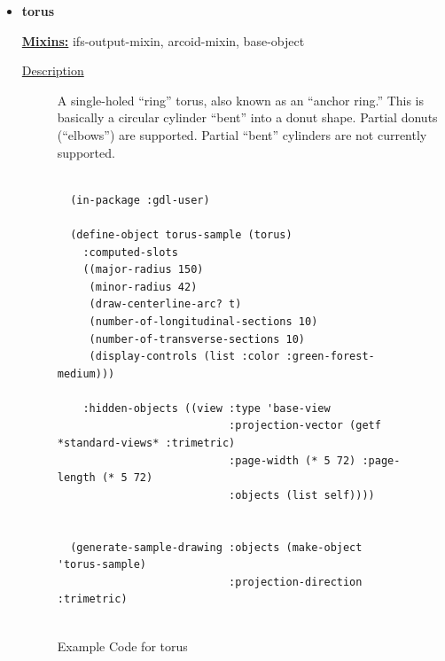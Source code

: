 \documentclass [11pt]{book}
\begin{document}
\begin{itemize}
\item {}
\label{prim:torus}
\textbf{torus}


\textbf{
\underline{Mixins:}} ifs-output-mixin, arcoid-mixin, base-object





\begin{description}

\item [
\underline{Description}]


A single-holed ``ring'' torus, also known as an ``anchor ring.''
This is basically a circular cylinder ``bent'' into a donut shape. Partial donuts (``elbows'') are supported.
Partial ``bent'' cylinders are not currently supported.



\end{description}




\begin{figure}
\begin{lrbox}{\boxedverb}
\begin{minipage}{\linewidth}
{\small

\begin{verbatim}
  
  (in-package :gdl-user)
  
  (define-object torus-sample (torus)
    :computed-slots
    ((major-radius 150)
     (minor-radius 42)
     (draw-centerline-arc? t)
     (number-of-longitudinal-sections 10)
     (number-of-transverse-sections 10)
     (display-controls (list :color :green-forest-medium)))

    :hidden-objects ((view :type 'base-view
                           :projection-vector (getf *standard-views* :trimetric)
                           :page-width (* 5 72) :page-length (* 5 72)
                           :objects (list self))))
  

  (generate-sample-drawing :objects (make-object 'torus-sample) 
                           :projection-direction :trimetric)
                  

\end{verbatim}}
\end{minipage}
\end{lrbox}
\fbox{\usebox{\boxedverb}}

\caption{Example Code for torus}

\label{fig:example-code-torus}

\end{figure}


\end{itemize}
\end{document}
